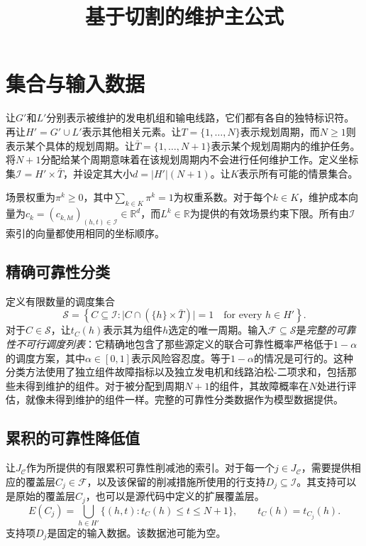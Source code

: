 \documentclass[11pt]{article}
\title{基于切割的维护主公式}
\author{}
\date{}
\begin{document}
\maketitle

\section{集合与输入数据}
让$G'$和$L'$分别表示被维护的发电机组和输电线路，它们都有各自的独特标识符。再让$H'=G'\cup L'$表示其他相关元素。让$T=\{1,\ldots,N\}$表示规划周期，而$N\geq 1$则表示某个具体的规划周期。让$\bar T=\{1,\ldots,N+1\}$表示某个规划周期内的维护任务。将$N+1$分配给某个周期意味着在该规划周期内不会进行任何维护工作。定义坐标集$\mathcal I=H'\times\bar T$，并设定其大小$d=|H'|(N+1)$。让$K$表示所有可能的情景集合。

场景权重为$\pi^k\geq 0$，其中$\sum_{k\in K}\pi^k=1$为权重系数。对于每个$k\in K$，维护成本向量为$c_k=(c_{k,ht})_{(h,t)\in\mathcal I}\in\mathbb R^d$，而$L^k\in\mathbb R$为提供的有效场景约束下限。所有由$\mathcal I$索引的向量都使用相同的坐标顺序。

\subsection{精确可靠性分类}
定义有限数量的调度集合
\[
\mathscr S=\left\{C\subseteq\mathcal I:
  \bigl|C\cap(\{h\}\times\bar T)\bigr|=1
  \quad\text{for every }h\in H'\right\}.
\]
对于$C\in\mathscr S$，让$t_C(h)$表示其为组件$h$选定的唯一周期。输入$\mathscr F\subseteq\mathscr S$是\emph{完整的可靠性不可行调度列表}：它精确地包含了那些源定义的联合可靠性概率严格低于$1-\alpha$的调度方案，其中$\alpha\in[0,1]$表示风险容忍度。等于$1-\alpha$的情况是可行的。这种分类方法使用了独立组件故障指标以及独立发电机和线路泊松-二项求和，包括那些未得到维护的组件。对于被分配到周期$N+1$的组件，其故障概率在$N$处进行评估，就像未得到维护的组件一样。完整的可靠性分类数据作为模型数据提供。

\subsection{累积的可靠性降低值}
让$J_{\mathcal C}$作为所提供的有限累积可靠性削减池的索引。对于每一个$j\in J_{\mathcal C}$，需要提供相应的覆盖层$C_j\in\mathscr F$，以及该保留的削减措施所使用的行支持$D_j\subseteq\mathcal I$。其支持可以是原始的覆盖层$C_j$，也可以是源代码中定义的扩展覆盖层。
\[
E(C_j)=\bigcup_{h\in H'}\{(h,t):t_C(h)\leq t\leq N+1\},
\qquad t_C(h)=t_{C_j}(h).
\]
支持项$D_j$是固定的输入数据。该数据池可能为空。
\end{document}
